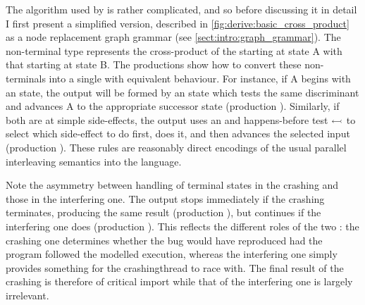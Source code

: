 The algorithm used by {\technique} is rather complicated, and so
before discussing it in detail I first present a simplified version,
described in \autoref{fig:derive:basic_cross_product} as a node
replacement graph grammar (see \autoref{sect:intro:graph_grammar}).
The non-terminal type  represents the cross-product of
the {\StateMachine} starting at state A with that starting at state B.
The productions show how to convert these non-terminals into a single
{\StateMachine} with equivalent behaviour.  For instance, if
{\StateMachine} A begins with an  state, the output
{\StateMachine} will be formed by an  state which tests the
same discriminant and advances A to the appropriate successor state
(production ).  Similarly, if both {\StateMachines}
are at simple side-effects, the output {\StateMachine} uses an
 and happens-before test $\leftarrowtail$ to select
which side-effect to do first, does it, and then advances the selected
input {\StateMachine} (production ).  These rules are
reasonably direct encodings of the usual parallel interleaving
semantics into the {\StateMachine} language.

Note the asymmetry between handling of terminal states in the crashing
{\StateMachine} and those in the interfering one.  The output
{\StateMachine} stops immediately if the crashing {\StateMachine}
terminates, producing the same result (production ), but
continues if the interfering {\StateMachine} one does (production
).  This reflects the different roles of the two
           {\StateMachines}: the crashing one determines whether the
           bug would have reproduced had the program followed the
           modelled execution, whereas the interfering one simply
           provides something for the \gls{crashingthread} to race
           with.  The final result of the crashing {\StateMachine} is
           therefore of critical import while that of the interfering
           one is largely irrelevant.

